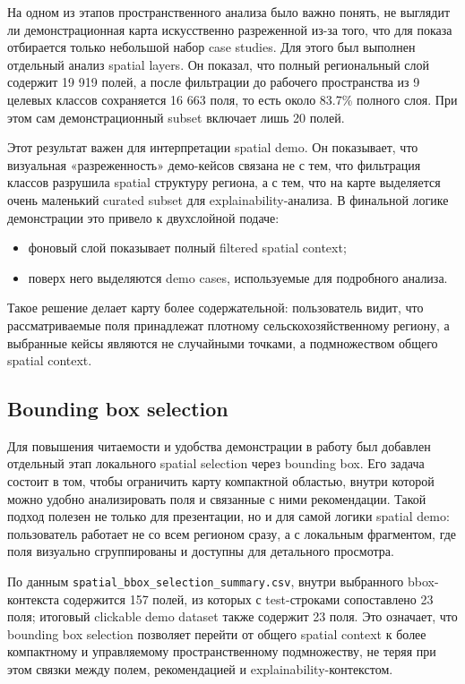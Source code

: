 На одном из этапов пространственного анализа было важно понять, не выглядит ли демонстрационная карта искусственно
разреженной из-за того, что для показа отбирается только небольшой набор case studies. Для этого был выполнен отдельный
анализ spatial layers. Он показал, что полный региональный слой содержит 19 919 полей, а после фильтрации до рабочего
пространства из 9 целевых классов сохраняется 16 663 поля, то есть около 83.7\% полного слоя. При этом сам
демонстрационный subset включает лишь 20 полей.

Этот результат важен для интерпретации spatial demo. Он показывает, что визуальная «разреженность» демо-кейсов связана
не с тем, что фильтрация классов разрушила spatial структуру региона, а с тем, что на карте выделяется очень маленький
curated subset для explainability-анализа. В финальной логике демонстрации это привело к двухслойной подаче:

\begin{itemize}
\tightlist
\item
  фоновый слой показывает полный filtered spatial context;
\item
  поверх него выделяются demo cases, используемые для подробного анализа.
\end{itemize}

Такое решение делает карту более содержательной: пользователь видит, что рассматриваемые поля принадлежат плотному
сельскохозяйственному региону, а выбранные кейсы являются не случайными точками, а подмножеством общего spatial context.

\subsection{Bounding box selection}

Для повышения читаемости и удобства демонстрации в работу был добавлен отдельный этап локального spatial selection через
bounding box. Его задача состоит в том, чтобы ограничить карту компактной областью, внутри которой можно удобно
анализировать поля и связанные с ними рекомендации. Такой подход полезен не только для презентации, но и для самой
логики spatial demo: пользователь работает не со всем регионом сразу, а с локальным фрагментом, где поля визуально
сгруппированы и доступны для детального просмотра.

По данным \texttt{spatial\_bbox\_selection\_summary.csv}, внутри выбранного bbox-контекста содержится 157 полей, из
которых с test-строками сопоставлено 23 поля; итоговый clickable demo dataset также содержит 23 поля. Это означает, что
bounding box selection позволяет перейти от общего spatial context к более компактному и управляемому пространственному
подмножеству, не теряя при этом связки между полем, рекомендацией и explainability-контекстом.

